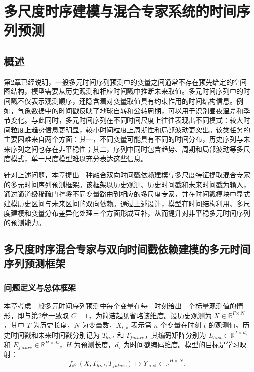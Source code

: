 \chapter{多尺度时序建模与混合专家系统的时间序列预测}

\section{概述}
第2章已经说明，一般多元时间序列预测中的变量之间通常不存在预先给定的空间图结构，模型需要从历史观测和相应时间戳中推断未来取值。多元时间序列中的时间戳不仅表示观测顺序，还隐含着对变量取值具有约束作用的时间结构信息。例如，气象数据中的时间戳反映了地球自转和公转周期，可以用于识别昼夜温差和季节变化。与此同时，多元时间序列在不同时间尺度上往往表现出不同模式：较大时间粒度上趋势信息更明显，较小时间粒度上周期性和局部波动更突出。该类任务的主要困难来自两个方面：其一，不同变量可能具有不同的时间分布，历史序列与未来序列之间也存在非平稳性；其二，序列中同时包含趋势、周期和局部波动等多尺度模式，单一尺度模型难以充分表达这些信息。

针对上述问题，本章提出一种融合双向时间戳依赖建模与多尺度特征提取混合专家的多元时间序列预测框架。该框架以历史观测、历史时间戳和未来时间戳为输入，通过通道级稀疏门控将不同变量路由到相应的多尺度专家，并在时间戳模块中显式建模历史区间与未来区间的双向依赖。通过上述设计，模型在时间结构利用、多尺度建模和变量分布差异化处理三个方面形成互补，从而提升对非平稳多元时间序列的预测能力。

\section{多尺度时序混合专家与双向时间戳依赖建模的多元时间序列预测框架}
\label{sec:ch3_method}

\subsection{问题定义与总体框架}
\label{sec:ch3_overall}

本章考虑一般多元时间序列预测中每个变量在每一时刻给出一个标量观测值的情形，即与第2章一致取 $C=1$，为简洁起见省略该维度。设历史观测为 ${X}\in\mathbb{R}^{T\times N}$，其中 $T$ 为历史长度，$N$ 为变量数，${X}_{t,n}$ 表示第 $n$ 个变量在时刻 $t$ 的观测值。历史时间戳和未来时间戳分别记为 ${T}_{hist}$ 和 ${T}_{future}$，其编码矩阵分别为 ${E}_{hist}\in\mathbb{R}^{T\times d_{\tau}}$ 和 ${E}_{future}\in\mathbb{R}^{H\times d_{\tau}}$，$H$ 为预测长度，$d_{\tau}$ 为时间戳编码维度。模型的目标是学习映射：
\begin{equation}
f_{\theta}:\left({X},{T}_{hist},{T}_{future}\right)
\mapsto Y_\mathrm{pred}\in\mathbb{R}^{H\times N}.
\end{equation}

